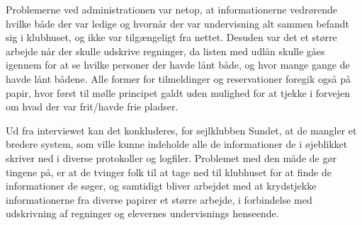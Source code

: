 Problemerne ved administrationen var netop, at informationerne vedrørende hvilke både der var ledige og hvornår der var undervisning alt sammen befandt sig i klubhuset, og ikke var tilgængeligt fra nettet. Desuden var det et større arbejde når der skulle udskrive regninger, da listen med udlån skulle gåes igennem for at se hvilke personer der havde lånt både, og hvor mange gange de havde lånt bådene. Alle former for tilmeldinger og reservationer foregik også på papir, hvor først til mølle principet galdt uden mulighed for at tjekke i forvejen om hvad der var frit/havde frie pladser.

Ud fra interviewet kan det konkluderes, for sejlklubben Sundet, at de mangler et bredere system, som ville kunne indeholde alle de informationer de i øjeblikket skriver ned i diverse protokoller og logfiler. Problemet med den måde de gør tingene på, er at de tvinger folk til at tage ned til klubhuset for at finde de informationer de søger, og samtidigt bliver arbejdet med at krydstjekke informationerne fra diverse papirer et større arbejde, i forbindelse med udskrivning af regninger og elevernes undervisnings henseende.  